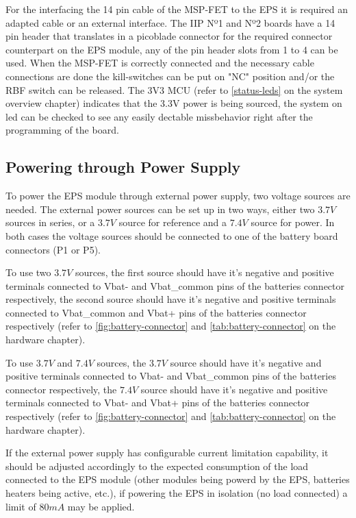 For the interfacing the 14 pin cable of the MSP-FET to the EPS it is required an adapted cable or an external interface. 
The IIP\cite{iip} Nº1 and Nº2 boards have a 14 pin header that translates in a picoblade connector for the required connector counterpart on the EPS module, any of the pin header slots from 1 to 4 can be used.
When the MSP-FET is correctly connected and the necessary cable connections are done the kill-switches can be put on "NC" position and/or the RBF switch can be released.
The 3V3 MCU (refer to \autoref{status-leds} on the system overview chapter) indicates that the 3.3V power is being sourced, the system on led can be checked to see any easily dectable missbehavior right after the programming of the board. 



\subsection{Powering through Power Supply}

To power the EPS module through external power supply, two voltage sources are needed.
The external power sources can be set up in two ways, either two \(3.7 V\) sources in series, or a \(3.7 V\) source for reference and a \(7.4 V\) source for power.
In both cases the voltage sources should be connected to one of the battery board connectors (P1 or P5).

To use two \(3.7 V\) sources, the first source should have it's negative and positive terminals connected to Vbat- and Vbat\_common pins of the batteries connector respectively, the second source should have it's negative and positive terminals connected to Vbat\_common and Vbat+ pins of the batteries connector respectively (refer to \autoref{fig:battery-connector} and \autoref{tab:battery-connector} on the hardware chapter).

To use \(3.7 V\) and \(7.4 V\) sources, the \(3.7 V\) source should have it's negative and positive terminals connected to Vbat- and Vbat\_common pins of the batteries connector respectively, the \(7.4 V\) source should have it's negative and positive terminals connected to Vbat- and Vbat+ pins of the batteries connector respectively (refer to \autoref{fig:battery-connector} and \autoref{tab:battery-connector} on the hardware chapter).

If the external power supply has configurable current limitation capability, it should be adjusted accordingly to the expected consumption of the load connected to the EPS module (other modules being powerd by the EPS, batteries heaters being active, etc.), if powering the EPS in isolation (no load connected) a limit of \(80 mA\) may be applied.

